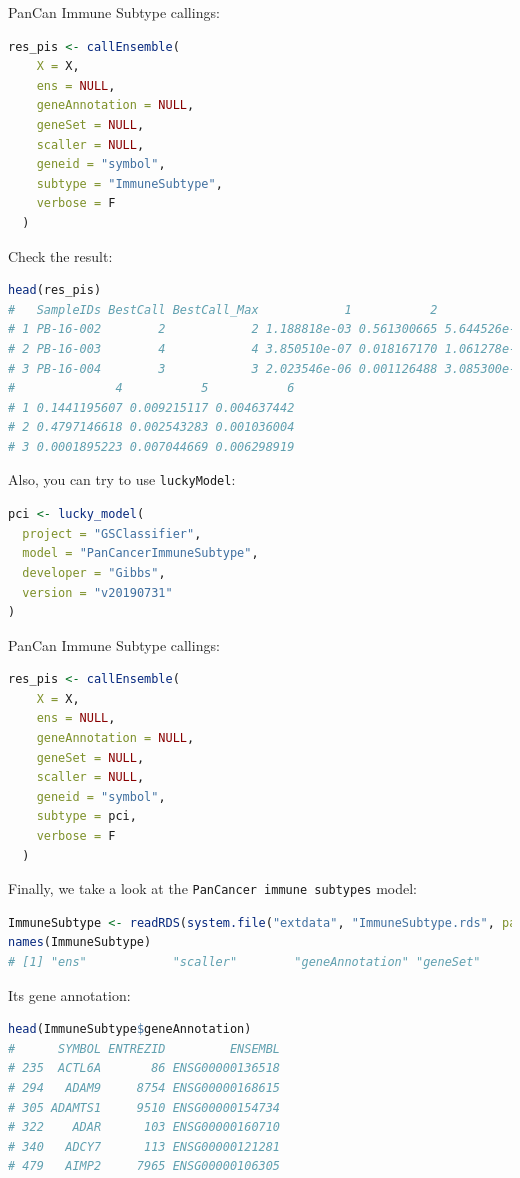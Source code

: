 \documentclass[
  12pt,
]{book}
\newcommand{\passthrough}[1]{#1}
\begin{document}
PanCan Immune Subtype callings:

\begin{lstlisting}[language=R]
res_pis <- callEnsemble(
    X = X,
    ens = NULL,
    geneAnnotation = NULL,
    geneSet = NULL,
    scaller = NULL,
    geneid = "symbol",
    subtype = "ImmuneSubtype",
    verbose = F
  )
\end{lstlisting}

Check the result:

\begin{lstlisting}[language=R]
head(res_pis)
#   SampleIDs BestCall BestCall_Max            1           2            3
# 1 PB-16-002        2            2 1.188818e-03 0.561300665 5.644526e-06
# 2 PB-16-003        4            4 3.850510e-07 0.018167170 1.061278e-04
# 3 PB-16-004        3            3 2.023546e-06 0.001126488 3.085300e-01
#              4           5           6
# 1 0.1441195607 0.009215117 0.004637442
# 2 0.4797146618 0.002543283 0.001036004
# 3 0.0001895223 0.007044669 0.006298919
\end{lstlisting}

Also, you can try to use \passthrough{\lstinline!luckyModel!}:

\begin{lstlisting}[language=R]
pci <- lucky_model(
  project = "GSClassifier",
  model = "PanCancerImmuneSubtype",
  developer = "Gibbs",
  version = "v20190731"
)
\end{lstlisting}

PanCan Immune Subtype callings:

\begin{lstlisting}[language=R]
res_pis <- callEnsemble(
    X = X,
    ens = NULL,
    geneAnnotation = NULL,
    geneSet = NULL,
    scaller = NULL,
    geneid = "symbol",
    subtype = pci,
    verbose = F
  )
\end{lstlisting}

Finally, we take a look at the \passthrough{\lstinline!PanCancer immune subtypes!} model:

\begin{lstlisting}[language=R]
ImmuneSubtype <- readRDS(system.file("extdata", "ImmuneSubtype.rds", package = "GSClassifier"))
names(ImmuneSubtype)
# [1] "ens"            "scaller"        "geneAnnotation" "geneSet"
\end{lstlisting}

Its gene annotation:

\begin{lstlisting}[language=R]
head(ImmuneSubtype$geneAnnotation)
#      SYMBOL ENTREZID         ENSEMBL
# 235  ACTL6A       86 ENSG00000136518
# 294   ADAM9     8754 ENSG00000168615
# 305 ADAMTS1     9510 ENSG00000154734
# 322    ADAR      103 ENSG00000160710
# 340   ADCY7      113 ENSG00000121281
# 479   AIMP2     7965 ENSG00000106305
\end{lstlisting}
\end{document}
